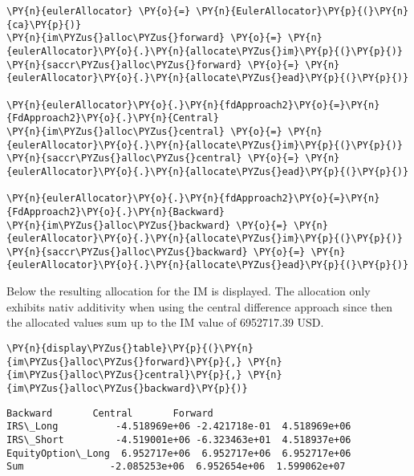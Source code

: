     \begin{tcolorbox}[breakable, size=fbox, boxrule=1pt, pad at break*=1mm,colback=cellbackground, colframe=cellborder]
\begin{Verbatim}[commandchars=\\\{\}]
\PY{n}{eulerAllocator} \PY{o}{=} \PY{n}{EulerAllocator}\PY{p}{(}\PY{n}{ca}\PY{p}{)}
\PY{n}{im\PYZus{}alloc\PYZus{}forward} \PY{o}{=} \PY{n}{eulerAllocator}\PY{o}{.}\PY{n}{allocate\PYZus{}im}\PY{p}{(}\PY{p}{)}
\PY{n}{saccr\PYZus{}alloc\PYZus{}forward} \PY{o}{=} \PY{n}{eulerAllocator}\PY{o}{.}\PY{n}{allocate\PYZus{}ead}\PY{p}{(}\PY{p}{)}

\PY{n}{eulerAllocator}\PY{o}{.}\PY{n}{fdApproach2}\PY{o}{=}\PY{n}{FdApproach2}\PY{o}{.}\PY{n}{Central}
\PY{n}{im\PYZus{}alloc\PYZus{}central} \PY{o}{=} \PY{n}{eulerAllocator}\PY{o}{.}\PY{n}{allocate\PYZus{}im}\PY{p}{(}\PY{p}{)}
\PY{n}{saccr\PYZus{}alloc\PYZus{}central} \PY{o}{=} \PY{n}{eulerAllocator}\PY{o}{.}\PY{n}{allocate\PYZus{}ead}\PY{p}{(}\PY{p}{)}

\PY{n}{eulerAllocator}\PY{o}{.}\PY{n}{fdApproach2}\PY{o}{=}\PY{n}{FdApproach2}\PY{o}{.}\PY{n}{Backward}
\PY{n}{im\PYZus{}alloc\PYZus{}backward} \PY{o}{=} \PY{n}{eulerAllocator}\PY{o}{.}\PY{n}{allocate\PYZus{}im}\PY{p}{(}\PY{p}{)}
\PY{n}{saccr\PYZus{}alloc\PYZus{}backward} \PY{o}{=} \PY{n}{eulerAllocator}\PY{o}{.}\PY{n}{allocate\PYZus{}ead}\PY{p}{(}\PY{p}{)}
\end{Verbatim}
\end{tcolorbox}

    Below the resulting allocation for the IM is displayed. The allocation
only exhibits nativ additivity when using the central difference
approach since then the allocated values sum up to the IM value of
6952717.39 USD.

    
    \begin{tcolorbox}[breakable, size=fbox, boxrule=1pt, pad at break*=1mm,colback=cellbackground, colframe=cellborder]
\begin{Verbatim}[commandchars=\\\{\}]
\PY{n}{display\PYZus{}table}\PY{p}{(}\PY{n}{im\PYZus{}alloc\PYZus{}forward}\PY{p}{,} \PY{n}{im\PYZus{}alloc\PYZus{}central}\PY{p}{,} \PY{n}{im\PYZus{}alloc\PYZus{}backward}\PY{p}{)}
\end{Verbatim}
\end{tcolorbox}

            \begin{tcolorbox}[breakable, size=fbox, boxrule=.5pt, pad at break*=1mm, opacityfill=0]
\begin{Verbatim}[commandchars=\\\{\}]
                       Backward       Central       Forward
IRS\_Long          -4.518969e+06 -2.421718e-01  4.518969e+06
IRS\_Short         -4.519001e+06 -6.323463e+01  4.518937e+06
EquityOption\_Long  6.952717e+06  6.952717e+06  6.952717e+06
Sum               -2.085253e+06  6.952654e+06  1.599062e+07
\end{Verbatim}
\end{tcolorbox}
        
